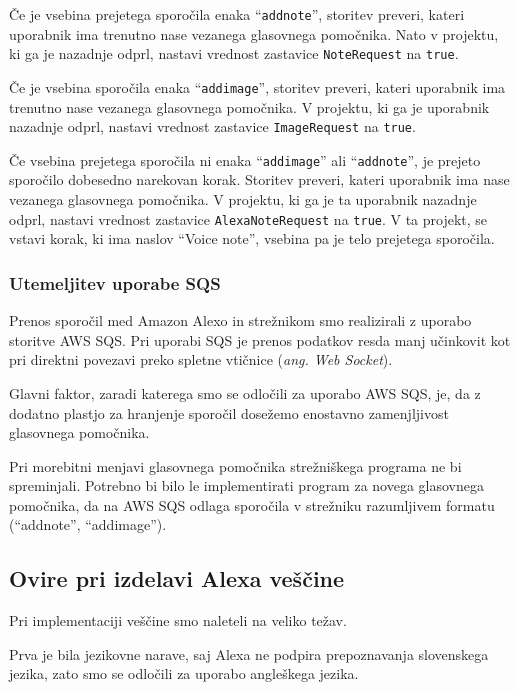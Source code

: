 \documentclass[a4paper, 12pt]{book}
\begin{document}
Če je vsebina prejetega sporočila enaka \enquote{\texttt{addnote}}, storitev preveri, kateri uporabnik ima trenutno nase vezanega glasovnega pomočnika.
Nato v projektu, ki ga je nazadnje odprl, nastavi vrednost zastavice \texttt{NoteRequest} na \texttt{true}.


Če je vsebina sporočila enaka \enquote{\texttt{addimage}}, storitev preveri, kateri uporabnik ima trenutno nase vezanega glasovnega pomočnika.
V projektu, ki ga je uporabnik nazadnje odprl, nastavi vrednost zastavice \texttt{ImageRequest} na \texttt{true}.

Če vsebina prejetega sporočila ni enaka \enquote{\texttt{addimage}} ali \enquote{\texttt{addnote}}, je prejeto sporočilo dobesedno narekovan korak.
Storitev preveri, kateri uporabnik ima nase vezanega glasovnega pomočnika.
V projektu, ki ga je ta uporabnik nazadnje odprl, nastavi vrednost zastavice \texttt{AlexaNoteRequest} na \texttt{true}.
V ta projekt, se vstavi korak, ki ima naslov \enquote{Voice note}, vsebina pa je telo prejetega sporočila.

\subsubsection{Utemeljitev uporabe SQS}

Prenos sporočil med Amazon Alexo in strežnikom smo realizirali z uporabo storitve AWS SQS.
Pri uporabi SQS je prenos podatkov resda manj učinkovit kot pri direktni povezavi preko spletne vtičnice (\textit{ang. Web Socket}).

Glavni faktor, zaradi katerega smo se odločili za uporabo AWS SQS, je, da z dodatno plastjo za hranjenje sporočil dosežemo enostavno zamenjljivost glasovnega pomočnika.

Pri morebitni menjavi glasovnega pomočnika strežniškega programa ne bi spreminjali.
Potrebno bi bilo le implementirati program za novega glasovnega pomočnika, da na AWS SQS odlaga sporočila v strežniku razumljivem formatu (\enquote{addnote}, \enquote{addimage}).


\subsection{Ovire pri izdelavi Alexa veščine}

Pri implementaciji veščine smo naleteli na veliko težav.

Prva je bila jezikovne narave, saj Alexa ne podpira prepoznavanja slovenskega jezika, zato smo se odločili za uporabo angleškega jezika.
\end{document}
